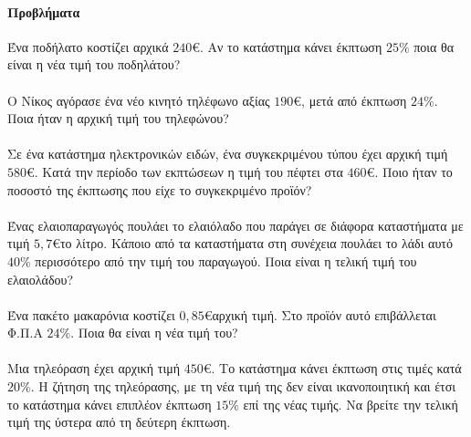 \documentclass[11pt,a4paper,modern]{FFExercises}
\begin{document}
\paragraph{Προβλήματα}
\askhsh Ένα ποδήλατο κοστίζει αρχικά $240$\euro. Αν το κατάστημα κάνει έκπτωση $25\%$ ποια θα είναι η νέα τιμή του ποδηλάτου?\\\\
\askhsh Ο Νίκος αγόρασε ένα νέο κινητό τηλέφωνο αξίας $190$\euro, μετά από έκπτωση $24\%$. Ποια ήταν η αρχική τιμή του τηλεφώνου?\\\\
\askhsh Σε ένα κατάστημα ηλεκτρονικών ειδών, ένα συγκεκριμένου τύπου  έχει αρχική τιμή $580$\euro. Κατά την περίοδο των εκπτώσεων η τιμή του πέφτει στα $460$\euro. Ποιο ήταν το ποσοστό της έκπτωσης που είχε το συγκεκριμένο προϊόν?\\\\
\askhsh Ένας ελαιοπαραγωγός πουλάει το ελαιόλαδο που παράγει σε διάφορα καταστήματα με τιμή $5{,}7$\euro το λίτρο. Κάποιο από τα καταστήματα στη συνέχεια πουλάει το λάδι αυτό $40\%$ περισσότερο από την τιμή του παραγωγού. Ποια είναι η τελική τιμή του ελαιολάδου?\\\\
\askhsh Ένα πακέτο μακαρόνια κοστίζει $0{,}85$\euro αρχική τιμή. Στο προϊόν αυτό επιβάλλεται Φ.Π.Α $24\%$. Ποια θα είναι η νέα τιμή του?\\\\
\askhsh Μια τηλεόραση έχει αρχική τιμή $450$\euro. Το κατάστημα κάνει έκπτωση στις τιμές κατά $20\%$. Η ζήτηση της τηλεόρασης, με τη νέα τιμή της δεν είναι ικανοποιητική και έτσι το κατάστημα κάνει επιπλέον έκπτωση $15\%$ επί της νέας τιμής. Να βρείτε την τελική τιμή της ύστερα από τη δεύτερη έκπτωση.\\\\
\askhsh 
\end{document}
